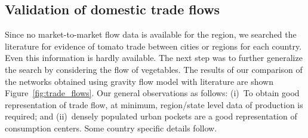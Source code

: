 \documentclass[10pt]{article}
\theoremstyle{definition}
\begin{document}
\subsection{Validation of domestic trade flows}
\label{sec:tradeFlows}
Since no market-to-market flow data is available for the region, we
searched the literature for evidence of tomato trade between cities or
regions for each country. Even this information is hardly
available. The next step was to further generalize the search by
considering the flow of vegetables. The results of our comparison of the
networks obtained using gravity flow model with literature are shown
Figure~\ref{fig:trade_flows}. Our general observations
as follows: (i)~To obtain good representation of trade flow, at minimum,
region/state level data of production is required; and (ii)~densely populated
urban pockets are a good representation of consumption centers. Some country
specific details follow.
\end{document}
